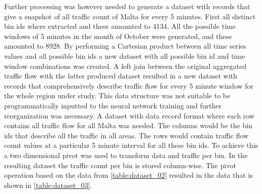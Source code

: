 \documentclass[12pt, a4paper]{report}
\theoremstyle{definition}
\theoremstyle{definition}%
\theoremstyle{definition}%
\theoremstyle{definition}%
\theoremstyle{definition}%
\theoremstyle{definition}%
\begin{document}
Further processing was however needed to generate a dataset with records that give a snapshot of all traffic count of Malta for every 5 minutes. First all distinct bin ids where extracted and these amounted to 4134. All the possible time windows of 5 minutes in the month of October were generated, and these amounted to 8928. By performing a Cartesian product between all time series values and all possible bin ids a new dataset with all possible bin id and time window combinations was created. A left join between the original aggregated traffic flow with the latter produced dataset resulted in a new dataset with records that comprehensively describe traffic flow for every 5 minute window for the whole region under study. This data structure was not suitable to be programmatically inputted to the neural network training and further reorganization was necessary. A dataset with data record format where each row contains all traffic flow for all Malta was needed. The columns would be the bin ids that describe all the traffic in all areas. The rows would contain traffic flow count values at a particular 5 minute interval for all these bin ids. To achieve this a two dimensional pivot was used to transform data and traffic per bin. In the resulting dataset the traffic count per bin is stored column-wise. The pivot operation based on the data from \ref{table:dataset_02}  resulted in the data that is shown in \ref{table:dataset_03}. 


\begin{table}[h]	
	\centering
	\caption{Sparse traffic flow matrix} 
	\label{table:dataset_03}
\end{table}
\end{document}
